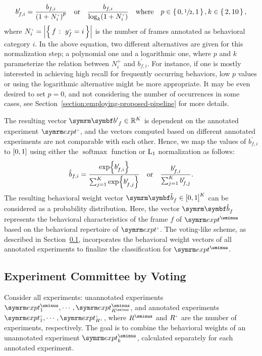 \begin{equation}
	b^\prime_{f,i} = \frac{b_{f,i}}{\rbr{1 + N^{\plus}_i}^p} \qbor \frac{b_{f,i}}{\log_k(1 + N^{\plus}_i)} \qbwhere p \in \set{0, \sfrac{1}{2}, 1}, k \in \set{2, 10},
\end{equation}
where $N^{\plus}_i = \card*{\Set{f}{y^{\plus}_f=i}}$ is the number of frames annotated as behavioral category $i$.
In the above equation, two different alternatives are given for this normalization step; a polynomial one and a logarithmic one, where $p$ and $k$ parameterize the relation between $N^{\plus}_i$ and $b^\prime_{f,i}$.
For instance, if one is mostly interested in achieving high recall for frequently occurring behaviors, low $p$ values or using the logarithmic alternative might be more appropriate.
It may be even desired to set $p=0$, and not considering the number of occurrences in some cases, see Section~\ref{section:employing-proposed-pipeline} for more details.

The resulting vector $\V{b^{\prime}}_f \in \reals^K$ is dependent on the annotated experiment $\exptAnn$, and the vectors computed based on different annotated experiments are not comparable with each other.
Hence, we map the values of $b^\prime_{f,i}$ to $\left[0,1\right]$ using either the $\operatorname {softmax}$ function or $\textnormal{L}_1$ normalization as follows:
\begin{equation}
	\hat{b}_{f,i} = \frac{\exp{b^\prime_{f,i}}}{\sum_{j=1}^{K} \exp{b^\prime_{f,j}}} \quad \textnormal{or} \quad \frac{b^\prime_{f,i}}{\sum_{j=1}^{K} b^\prime_{f,j}}.
\end{equation}
The resulting behavioral weight vector $\V{\hat{b}}_f \in \sqbr{0,1}^K$ can be considered as a probability distribution.
Here, the vector $\V{\hat{b}}_f$ represents the behavioral characteristics of the frame $f$ of $\exptUnann$ based on the behavioral repertoire of $\exptAnn$.
The voting-like scheme, as described in Section~\ref{section:committee-by-voting}, incorporates the behavioral weight vectors of all annotated experiments to finalize the classification for $\exptUnann$.

\subsection{Experiment Committee by Voting}\label{section:committee-by-voting}
Consider all experiments: unannotated experiments $\exptUnann_1, \cdots, \exptUnann_{\Unann{R}}$, and annotated experiments $\exptAnn_1, \cdots, \exptAnn_{\Ann{R}}$, where $\Unann{R}$ and $\Ann{R}$ are the number of experiments, respectively.
The goal is to combine the behavioral weights of an unannotated experiment $\exptUnann_k$, calculated separately for each annotated experiment.

